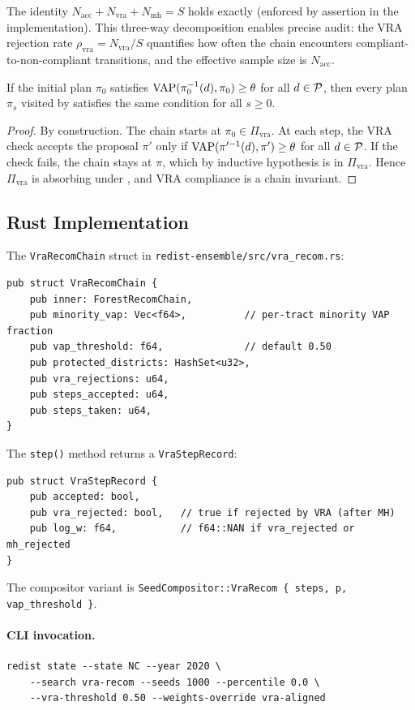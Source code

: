 The identity $N_{\mathrm{acc}} + N_{\mathrm{vra}} + N_{\mathrm{mh}} = S$
holds exactly (enforced by assertion in the implementation).
This three-way decomposition enables precise audit: the VRA rejection rate
$\rho_{\mathrm{vra}} = N_{\mathrm{vra}} / S$ quantifies how often the chain
encounters compliant-to-non-compliant transitions, and the effective sample
size is $N_{\mathrm{acc}}$.

\begin{proposition}
\label{prop:vra-invariant}
If the initial plan $\pi_0$ satisfies $\mathrm{VAP}(\pi_0^{-1}(d), \pi_0) \geq \theta$
for all $d \in \mathcal{P}$, then every plan $\pi_s$ visited by \vr{} satisfies
the same condition for all $s \geq 0$.
\end{proposition}

\begin{proof}
By construction.
The chain starts at $\pi_0 \in \Pi_{\mathrm{vra}}$.
At each step, the VRA check accepts the proposal $\pi'$ only if
$\mathrm{VAP}(\pi'^{-1}(d), \pi') \geq \theta$ for all $d \in \mathcal{P}$.
If the check fails, the chain stays at $\pi$, which by inductive hypothesis
is in $\Pi_{\mathrm{vra}}$.
Hence $\Pi_{\mathrm{vra}}$ is absorbing under \vr{}, and VRA compliance is
a chain invariant.
\end{proof}

\subsection{Rust Implementation}

The \texttt{VraRecomChain} struct in \texttt{redist-ensemble/src/vra\_recom.rs}:

\begin{verbatim}
pub struct VraRecomChain {
    pub inner: ForestRecomChain,
    pub minority_vap: Vec<f64>,          // per-tract minority VAP fraction
    pub vap_threshold: f64,              // default 0.50
    pub protected_districts: HashSet<u32>,
    pub vra_rejections: u64,
    pub steps_accepted: u64,
    pub steps_taken: u64,
}
\end{verbatim}

The \texttt{step()} method returns a \texttt{VraStepRecord}:

\begin{verbatim}
pub struct VraStepRecord {
    pub accepted: bool,
    pub vra_rejected: bool,   // true if rejected by VRA (after MH)
    pub log_w: f64,           // f64::NAN if vra_rejected or mh_rejected
}
\end{verbatim}

The compositor variant is \texttt{SeedCompositor::VraRecom \{ steps, p, vap\_threshold \}}.

\paragraph{CLI invocation.}
\begin{verbatim}
redist state --state NC --year 2020 \
    --search vra-recom --seeds 1000 --percentile 0.0 \
    --vra-threshold 0.50 --weights-override vra-aligned
\end{verbatim}
